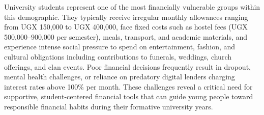 \documentclass[12pt]{article}
\begin{document}
University students represent one of the most financially vulnerable groups within this demographic.
They typically receive irregular monthly allowances ranging from UGX 150,000 to UGX 400,000, face fixed costs such as hostel fees (UGX 500,000–900,000 per semester), meals, transport, and academic materials, and experience intense social pressure to spend on entertainment, fashion, and cultural obligations including contributions to funerals, weddings, church offerings, and clan events. Poor financial decisions frequently result in dropout, mental health challenges, or reliance on predatory digital lenders charging interest rates above 100\% per month.
These challenges reveal a critical need for supportive, student-centered financial tools that can guide young people toward responsible financial habits during their formative university years.
\end{document}
